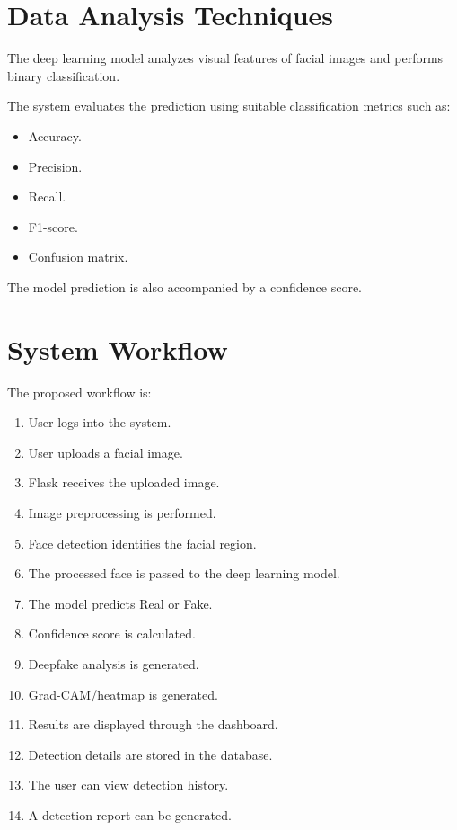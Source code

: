 \documentclass[12pt,a4paper,oneside]{report}
\begin{document}
\section{Data Analysis Techniques}

The deep learning model analyzes visual features of facial images and performs binary classification.

The system evaluates the prediction using suitable classification metrics such as:

\begin{itemize}
    \item Accuracy.
    \item Precision.
    \item Recall.
    \item F1-score.
    \item Confusion matrix.
\end{itemize}

The model prediction is also accompanied by a confidence score.

\section{System Workflow}

The proposed workflow is:

\begin{enumerate}
    \item User logs into the system.
    \item User uploads a facial image.
    \item Flask receives the uploaded image.
    \item Image preprocessing is performed.
    \item Face detection identifies the facial region.
    \item The processed face is passed to the deep learning model.
    \item The model predicts Real or Fake.
    \item Confidence score is calculated.
    \item Deepfake analysis is generated.
    \item Grad-CAM/heatmap is generated.
    \item Results are displayed through the dashboard.
    \item Detection details are stored in the database.
    \item The user can view detection history.
    \item A detection report can be generated.
\end{enumerate}
\end{document}
